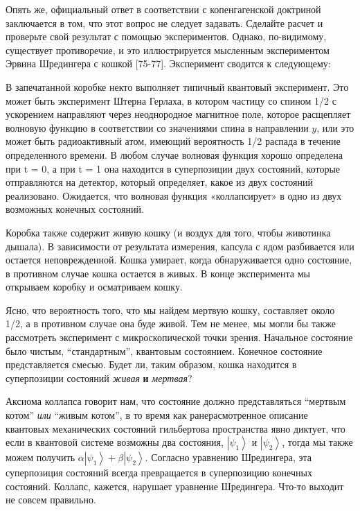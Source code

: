 \documentclass[main.tex]{subfiles}
\begin{document}
Опять же, официальный ответ в соответствии с копенгагенской доктриной заключается в том, что этот вопрос не следует задавать. Сделайте расчет и проверьте свой результат с помощью экспериментов. Однако, по-видимому, существует противоречие, и это иллюстрируется мысленным экспериментом Эрвина Шредингера с кошкой [75-77]. Эксперимент сводится к следующему:

В запечатанной коробке некто выполняет типичный квантовый эксперимент. Это может быть эксперимент Штерна Герлаха, в котором частицу со спином 1/2 с ускорением направляют через неоднородное магнитное поле, которое расщепляет волновую функцию в соответствии со значениями спина в направлении $y$, или это может быть радиоактивный атом, имеющий вероятность 1/2 распада в течение определенного времени. В любом случае волновая функция хорошо определена при t = 0, а при t = 1 она находится в суперпозиции двух состояний, которые отправляются на детектор, который определяет, какое из двух состояний реализовано. Ожидается, что волновая функция «коллапсирует» в одно из двух возможных конечных состояний.

Коробка также содержит живую кошку (и воздух для того, чтобы животинка дышала). В зависимости от результата измерения, капсула с ядом разбивается или остается неповрежденной. Кошка умирает, когда обнаруживается одно состояние, в противном случае кошка остается в живых. В конце эксперимента мы открываем коробку и осматриваем кошку.

Ясно, что вероятность того, что мы найдем мертвую кошку, составляет около 1/2, а в противном случае она буде живой. Тем не менее, мы могли бы также рассмотреть эксперимент с микроскопической точки зрения. Начальное состояние было чистым, ``стандартным'', квантовым состоянием. Конечное состояние представляется смесью. Будет ли, таким образом, кошка находится в суперпозиции состояний \textit{живая} \textbf{и} \textit{мертвая}?

Аксиома коллапса говорит нам, что состояние  должно представляться ``мертвым котом'' \textit{или} ``живым котом'', в то время как ранерасмотренное описание квантовых механических состояний гильбертова пространства явно диктует, что если в квантовой системе возможны два состояния, $\left|\psi_1\right>$ и $\left|\psi_2\right>$, тогда мы также можем получить $\alpha\left|\psi_1\right> + \beta\left|\psi_2\right>$. Согласно уравнению Шредингера, эта суперпозиция состояний всегда превращается в суперпозицию конечных состояний. Коллапс, кажется, нарушает уравнение Шредингера. Что-то выходит не совсем правильно.
\end{document}
